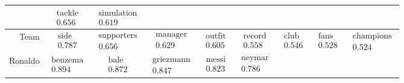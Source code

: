 \documentclass[10pt, a4paper]{UUThesisTemplate}
\begin{document}
\begin{table}[hb]
\begin{tabular}{r|c c c c c c c c}
 & $\begin{matrix}\text{tackle}\\0.656\end{matrix}$
 & $\begin{matrix}\text{simulation}\\0.619\end{matrix}$
\\\hline
Team
 & $\begin{matrix}\text{side}\\0.787\end{matrix}$
 & $\begin{matrix}\text{supporters}\\0.656\end{matrix}$
 & $\begin{matrix}\text{manager}\\0.629\end{matrix}$
 & $\begin{matrix}\text{outfit}\\0.605\end{matrix}$
 & $\begin{matrix}\text{record}\\0.558\end{matrix}$
 & $\begin{matrix}\text{club}\\0.546\end{matrix}$
 & $\begin{matrix}\text{fans}\\0.528\end{matrix}$
 & $\begin{matrix}\text{champions}\\0.524\end{matrix}$
\\\hline
Ronaldo
 & $\begin{matrix}\text{benzema}\\0.894\end{matrix}$
 & $\begin{matrix}\text{bale}\\0.872\end{matrix}$
 & $\begin{matrix}\text{griezmann}\\0.847\end{matrix}$
 & $\begin{matrix}\text{messi}\\0.823\end{matrix}$
 & $\begin{matrix}\text{neymar}\\0.786\end{matrix}$

\end{tabular}
\end{table}
\end{document}
